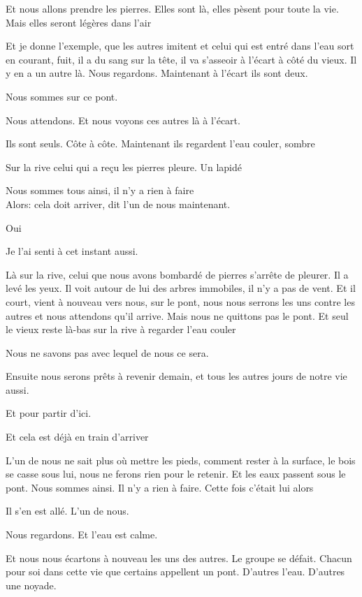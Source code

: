 Et nous allons prendre les pierres. Elles sont là, elles pèsent pour
toute la vie. Mais elles seront légères dans l'air

Et je donne l'exemple, que les autres imitent et celui qui est entré
dans l'eau sort en courant, fuit, il a du sang sur la tête, il va
s'asseoir à l'écart à côté du vieux. Il y en a un autre là. Nous
regardons. Maintenant à l'écart ils sont deux.

Nous sommes sur ce pont.

Nous attendons. Et nous voyons ces autres là à l'écart.

Ils sont seuls. Côte à côte. Maintenant ils regardent l'eau couler,
sombre

Sur la rive celui qui a reçu les pierres pleure. Un lapidé

Nous sommes tous ainsi, il n'y a rien à faire\\

Alors: cela doit arriver, dit l'un de nous maintenant.

Oui

Je l'ai senti à cet instant aussi.

Là sur la rive, celui que nous avons bombardé de pierres s'arrête de
pleurer. Il a levé les yeux. Il voit autour de lui des arbres immobiles,
il n'y a pas de vent. Et il court, vient à nouveau vers nous, sur le
pont, nous nous serrons les uns contre les autres et nous attendons
qu'il arrive. Mais nous ne quittons pas le pont. Et seul le vieux reste
là-bas sur la rive à regarder l'eau couler

Nous ne savons pas avec lequel de nous ce sera.

Ensuite nous serons prêts à revenir demain, et tous les autres jours de
notre vie aussi.

Et pour partir d'ici.

Et cela est déjà en train d'arriver

L'un de nous ne sait plus où mettre les pieds, comment rester à la
surface, le bois se casse sous lui, nous ne ferons rien pour le retenir.
Et les eaux passent sous le pont. Nous sommes ainsi. Il n'y a rien à
faire. Cette fois c'était lui alors

Il s'en est allé. L'un de nous.

Nous regardons. Et l'eau est calme.

Et nous nous écartons à nouveau les uns des autres. Le groupe se défait.
Chacun pour soi dans cette vie que certains appellent un pont. D'autres
l'eau. D'autres une noyade.

